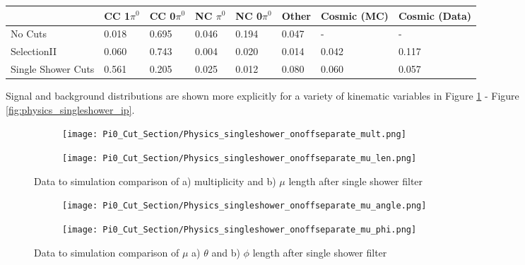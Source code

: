\documentclass{article}
\begin{document}
\begin{table}[H]
\centering
{}
 \begin{tabular}{| l | l | l |l|l|l|l|l|}
 \hline
  & CC 1$\pi^0$ & CC 0$\pi^0$ & NC $\pi^0$ & NC 0$\pi^0$ & Other& Cosmic (MC) & Cosmic (Data) \\ [0.1ex] \hline
No Cuts  & 0.018 &  0.695 & 0.046 & 0.194  & 0.047 & -&-\\
SelectionII & 0.060 & 0.743 & 0.004 & 0.020 & 0.014 & 0.042 & 0.117  \\ 
Single Shower Cuts & 0.561 & 0.205 & 0.025 & 0.012 & 0.080 & 0.060 & 0.057 \\ \hline
\end{tabular}
\end{table}

Signal and background distributions are shown more explicitly for a variety of kinematic variables in Figure \ref{fig:physics_singleshower_mulen} - Figure \ref{fig:physics_singleshower_ip}.

\begin{figure}[H]
\centering
  \begin{subfigure}[t]{0.3\textwidth}
    \centering
\texttt{[image: Pi0\_Cut\_Section/Physics\_singleshower\_onoffseparate\_mult.png]}
  \caption{ }
  \end{subfigure} 
  \hspace{20mm}
  \begin{subfigure}[t]{0.3\textwidth}
    \centering
\texttt{[image: Pi0\_Cut\_Section/Physics\_singleshower\_onoffseparate\_mu\_len.png]}
  \caption{ }
  \end{subfigure} 

\caption{ Data to simulation comparison of a) multiplicity and b) $\mu$ length after single shower filter }
\label{fig:physics_singleshower_mulen}
\end{figure}

\begin{figure}[H]
\centering
  \begin{subfigure}[t]{0.3\textwidth}
    \centering
\texttt{[image: Pi0\_Cut\_Section/Physics\_singleshower\_onoffseparate\_mu\_angle.png]}
  \caption{ }
  \end{subfigure} 
  \hspace{20mm}
  \begin{subfigure}[t]{0.3\textwidth}
    \centering
\texttt{[image: Pi0\_Cut\_Section/Physics\_singleshower\_onoffseparate\_mu\_phi.png]}
  \caption{ }
  \end{subfigure} 
\caption{ Data to simulation comparison of $\mu$ a) $\theta$ and b) $\phi$ length after single shower filter }
\label{fig:physics_singleshower_muphi}
\end{figure}
\end{document}
